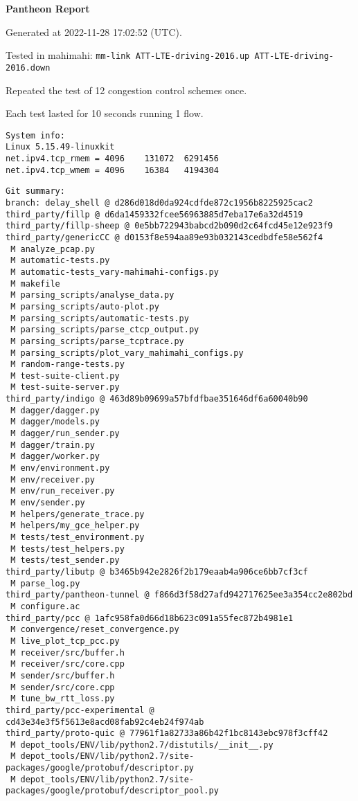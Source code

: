 \documentclass{article}
\begin{document}
\centerline{\textbf{\large{Pantheon Report}}}
\vspace{20pt}

Generated at 2022-11-28 17:02:52 (UTC).

Tested in mahimahi: \texttt{mm-link ATT-LTE-driving-2016.up ATT-LTE-driving-2016.down}

Repeated the test of 12 congestion control schemes once.

Each test lasted for 10 seconds running 1 flow.

\begin{verbatim}
System info:
Linux 5.15.49-linuxkit
net.ipv4.tcp_rmem = 4096	131072	6291456
net.ipv4.tcp_wmem = 4096	16384	4194304
\end{verbatim}

\begin{verbatim}
Git summary:
branch: delay_shell @ d286d018d0da924cdfde872c1956b8225925cac2
third_party/fillp @ d6da1459332fcee56963885d7eba17e6a32d4519
third_party/fillp-sheep @ 0e5bb722943babcd2b090d2c64fcd45e12e923f9
third_party/genericCC @ d0153f8e594aa89e93b032143cedbdfe58e562f4
 M analyze_pcap.py
 M automatic-tests.py
 M automatic-tests_vary-mahimahi-configs.py
 M makefile
 M parsing_scripts/analyse_data.py
 M parsing_scripts/auto-plot.py
 M parsing_scripts/automatic-tests.py
 M parsing_scripts/parse_ctcp_output.py
 M parsing_scripts/parse_tcptrace.py
 M parsing_scripts/plot_vary_mahimahi_configs.py
 M random-range-tests.py
 M test-suite-client.py
 M test-suite-server.py
third_party/indigo @ 463d89b09699a57bfdfbae351646df6a60040b90
 M dagger/dagger.py
 M dagger/models.py
 M dagger/run_sender.py
 M dagger/train.py
 M dagger/worker.py
 M env/environment.py
 M env/receiver.py
 M env/run_receiver.py
 M env/sender.py
 M helpers/generate_trace.py
 M helpers/my_gce_helper.py
 M tests/test_environment.py
 M tests/test_helpers.py
 M tests/test_sender.py
third_party/libutp @ b3465b942e2826f2b179eaab4a906ce6bb7cf3cf
 M parse_log.py
third_party/pantheon-tunnel @ f866d3f58d27afd942717625ee3a354cc2e802bd
 M configure.ac
third_party/pcc @ 1afc958fa0d66d18b623c091a55fec872b4981e1
 M convergence/reset_convergence.py
 M live_plot_tcp_pcc.py
 M receiver/src/buffer.h
 M receiver/src/core.cpp
 M sender/src/buffer.h
 M sender/src/core.cpp
 M tune_bw_rtt_loss.py
third_party/pcc-experimental @ cd43e34e3f5f5613e8acd08fab92c4eb24f974ab
third_party/proto-quic @ 77961f1a82733a86b42f1bc8143ebc978f3cff42
 M depot_tools/ENV/lib/python2.7/distutils/__init__.py
 M depot_tools/ENV/lib/python2.7/site-packages/google/protobuf/descriptor.py
 M depot_tools/ENV/lib/python2.7/site-packages/google/protobuf/descriptor_pool.py

\end{verbatim}
\end{document}
